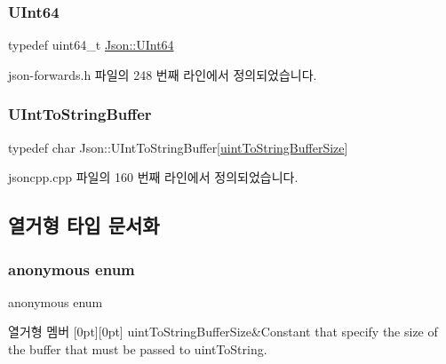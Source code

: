 \subsubsection{\texorpdfstring{U\+Int64}{UInt64}}
{\footnotesize\ttfamily typedef uint64\+\_\+t \hyperlink{namespace_json_adf3fa5cb60c619e4f02315ad355e0ca1}{Json\+::\+U\+Int64}}



json-\/forwards.\+h 파일의 248 번째 라인에서 정의되었습니다.

\mbox{\label{namespace_json_a602bcf69c2042fb61c3b243cb16f04ca}} 
\subsubsection{\texorpdfstring{U\+Int\+To\+String\+Buffer}{UIntToStringBuffer}}
{\footnotesize\ttfamily typedef char Json\+::\+U\+Int\+To\+String\+Buffer\mbox{[}\hyperlink{namespace_json_a2aacab54ef6fc18e833fbd4982a0a23aae4f2008c7919f20d81286121d1374424}{uint\+To\+String\+Buffer\+Size}\mbox{]}}



jsoncpp.\+cpp 파일의 160 번째 라인에서 정의되었습니다.



\subsection{열거형 타입 문서화}
\mbox{\label{namespace_json_a2aacab54ef6fc18e833fbd4982a0a23a}} 
\subsubsection{\texorpdfstring{anonymous enum}{anonymous enum}}
{\footnotesize\ttfamily anonymous enum}

\begin{DoxyEnumFields}{열거형 멤버}
[0pt][0pt]{}\mbox{\label{namespace_json_a2aacab54ef6fc18e833fbd4982a0a23aae4f2008c7919f20d81286121d1374424}} 
uint\+To\+String\+Buffer\+Size&Constant that specify the size of the buffer that must be passed to uint\+To\+String. \\
\hline

\end{DoxyEnumFields}


